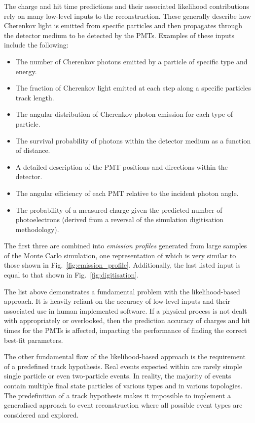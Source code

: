 The charge and hit time predictions and their associated likelihood contributions rely on many
low-level inputs to the reconstruction. These generally describe how Cherenkov light is emitted
from specific particles and then propagates through the detector medium to be detected by the
PMTs. Examples of these inputs include the following:
\begin{itemize}
    \item The number of Cherenkov photons emitted by a particle of specific type and energy.
    \item The fraction of Cherenkov light emitted at each step along a specific particles track
          length.
    \item The angular distribution of Cherenkov photon emission for each type of particle.
    \item The survival probability of photons within the detector medium as a function of
          distance.
    \item A detailed description of the PMT positions and directions within the detector.
    \item The angular efficiency of each PMT relative to the incident photon angle.
    \item The probability of a measured charge given the predicted number of photoelectrons
          (derived from a reversal of the simulation digitisation methodology).
\end{itemize}
The first three are combined into \emph{emission profiles} generated from large samples of the
Monte Carlo simulation, one representation of which is very similar to those shown in
Fig.~\ref{fig:emission_profile}. Additionally, the last listed input is equal to that shown in
Fig.~\ref{fig:digitisation}.

The list above demonstrates a fundamental problem with the likelihood-based approach. It is
heavily reliant on the accuracy of low-level inputs and their associated use in human implemented
software. If a physical process is not dealt with appropriately or overlooked, then the prediction
accuracy of charges and hit times for the PMTs is affected, impacting the performance of finding
the correct best-fit parameters.

The other fundamental flaw of the likelihood-based approach is the requirement of a predefined
track hypothesis. Real events expected within \chips are rarely simple single particle or even
two-particle events. In reality, the majority of events contain multiple final state particles of
various types and in various topologies. The predefinition of a track hypothesis makes it
impossible to implement a generalised approach to event reconstruction where all possible event
types are considered and explored.

